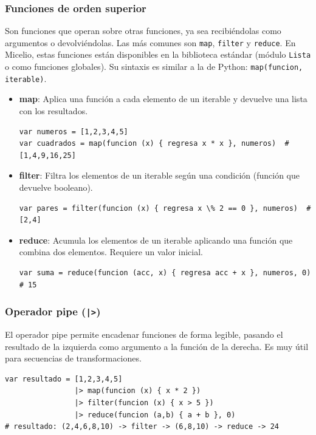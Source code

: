 \documentclass[12pt]{article}
\begin{document}
\subsubsection*{Funciones de orden superior}
Son funciones que operan sobre otras funciones, ya sea recibiéndolas como argumentos o devolviéndolas. Las más comunes son \texttt{map}, \texttt{filter} y \texttt{reduce}. En Micelio, estas funciones están disponibles en la biblioteca estándar (módulo \texttt{Lista} o como funciones globales). Su sintaxis es similar a la de Python: \texttt{map(funcion, iterable)}.

\begin{itemize}
    \item \textbf{map}: Aplica una función a cada elemento de un iterable y devuelve una lista con los resultados.
\begin{lstlisting}
var numeros = [1,2,3,4,5]
var cuadrados = map(funcion (x) { regresa x * x }, numeros)  # [1,4,9,16,25]
\end{lstlisting}

    \item \textbf{filter}: Filtra los elementos de un iterable según una condición (función que devuelve booleano).
\begin{lstlisting}
var pares = filter(funcion (x) { regresa x \% 2 == 0 }, numeros)  # [2,4]
\end{lstlisting}

    \item \textbf{reduce}: Acumula los elementos de un iterable aplicando una función que combina dos elementos. Requiere un valor inicial.
\begin{lstlisting}
var suma = reduce(funcion (acc, x) { regresa acc + x }, numeros, 0)  # 15
\end{lstlisting}
\end{itemize}

\subsubsection*{Operador pipe (\texttt{|>})}
El operador pipe permite encadenar funciones de forma legible, pasando el resultado de la izquierda como argumento a la función de la derecha. Es muy útil para secuencias de transformaciones.

\begin{lstlisting}
var resultado = [1,2,3,4,5]
                |> map(funcion (x) { x * 2 })
                |> filter(funcion (x) { x > 5 })
                |> reduce(funcion (a,b) { a + b }, 0)
# resultado: (2,4,6,8,10) -> filter -> (6,8,10) -> reduce -> 24
\end{lstlisting}
\end{document}

